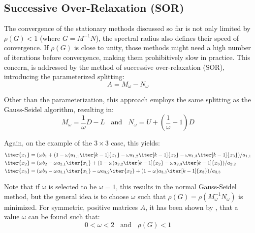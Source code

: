 \subsection{Successive Over-Relaxation (SOR)}
The convergence of the stationary methods discussed so far is not only limited by $\rho(G)<1$ (where $G=M^{-1}N$), the spectral radius also defines their speed of convergence. If $\rho(G)$ is close to unity, those methods might need a high number of iterations before convergence, making them prohibitively slow in practice. This concern, is addressed by the method of successive over-relaxation (SOR), introducing the parameterized splitting:
\begin{equation}
    A=M_\omega - N_\omega
\end{equation}

\noindent Other than the parameterization, this approach employs the same splitting as the Gauss-Seidel algorithm, resulting in:
\begin{equation}
    M_\omega=\frac{1}\omega{}D-L \;\;\text{ and } \;\; N_\omega=U+\left(\frac{1}{\omega}-1\right)D
\end{equation}

\noindent Again, on the example of the $3 \times 3$ case, this yields:
\begin{equation}
\label{eqn:sor}
   \begin{aligned}
    \iter{x_1} & =  (\omega b_1 +(1-\omega)a_{1,1}\iter[k-1]{x_1} -\omega a_{1,2}\iter[k-1]{x_2} - \omega a_{1,3}\iter[k-1]{x_3})/a_{1,1} \\
    \iter{x_2} & =  (\omega b_2 -\omega a_{2,1}\iter{x_1} +(1-\omega) a_{2,2}\iter[k-1]{x_2} - \omega a_{2,3}\iter[k-1]{x_3})/a_{2,2} \\
    \iter{x_3} & =  (\omega b_3 -\omega a_{3,1}\iter{x_1} -\omega a_{3,2}\iter{x_2} + (1-\omega) a_{3,3}\iter[k-1]{x_3})/a_{3,3} \\
\end{aligned} 
\end{equation}

\noindent Note that if $\omega$ is selected to be $\omega = 1$, this results in the normal Gauss-Seidel method, but the general idea is to choose $\omega$ such that $\rho(G)=\rho(M^{-1}_\omega N_\omega)$ is minimized. For symmetric, positive matrices $A$, it has been shown by \cite{young_convergence_1970}, that a value $\omega$ can be found such that:
\begin{equation}
       0<\omega<2 \;\;\text{ and }\;\; \rho(G)<1
\end{equation}

